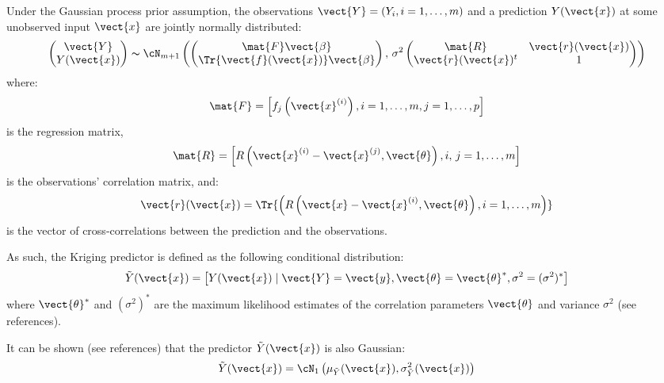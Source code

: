 {  Under the Gaussian process prior assumption, the observations $\vect{Y} = \left(Y_i, i = 1, \ldots, m\right)$ and a prediction $Y(\vect{x})$ at some unobserved input $\vect{x}$ are jointly normally distributed:
  \begin{equation}
    \begin{pmatrix}
      \vect{Y} \\
      Y(\vect{x})
    \end{pmatrix}
    \thicksim
    \cN_{m + 1}\left(
      \begin{pmatrix}
        \mat{F} \vect{\beta} \\
        \Tr{\vect{f}(\vect{x})} \vect{\beta}
      \end{pmatrix}
      ,\,\sigma^2
      \begin{pmatrix}
        \mat{R} & \vect{r}(\vect{x}) \\
        \vect{r}(\vect{x})^t & 1
      \end{pmatrix}
    \right)
  \end{equation}
  where:
  \begin{equation}
    \mat{F} = \left[f_j\left(\vect{x}^{(i)}\right), i = 1, \ldots, m, j = 1, \ldots, p\right]
  \end{equation}
  is the regression matrix,
  \begin{equation}
    \mat{R} = \left[R\left(\vect{x}^{(i)} - \vect{x}^{(j)}, \vect{\theta}\right), i,\,j = 1, \ldots, m\right]
  \end{equation}
  is the observations' correlation matrix, and:
  \begin{equation}
    \vect{r}(\vect{x}) = \Tr{\left(R\left(\vect{x} - \vect{x}^{(i)}, \vect{\theta}\right), i = 1, \ldots, m\right)}
  \end{equation}
  is the vector of cross-correlations between the prediction and the observations.

  As such, the Kriging predictor is defined as the following conditional distribution:
  \begin{equation}
    \tilde{Y}(\vect{x}) = \left[Y(\vect{x}) \mid \vect{Y} = \vect{y}, \vect{\theta}=\vect{\theta}^*, \sigma^2=(\sigma^2)^*\right]
  \end{equation}
  where $\vect{\theta}^*$ and $(\sigma^2)^*$ are the maximum likelihood estimates of the correlation parameters $\vect{\theta}$ and variance $\sigma^2$ (see references).

  It can be shown (see references) that the predictor $\tilde{Y}(\vect{x})$ is also Gaussian:
  \begin{equation}
    \tilde{Y}(\vect{x}) = \cN_1\left(\mu_{\tilde{Y}}(\vect{x}), \sigma^2_{\tilde{Y}}(\vect{x})\right)
  \end{equation}

}
